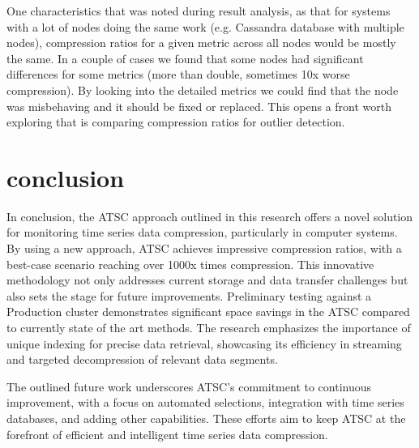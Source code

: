 \documentclass[conference]{IEEEtran}
\begin{document}
One characteristics that was noted during result analysis, as that for systems with a lot of nodes doing the same work (e.g. Cassandra database with multiple nodes), compression ratios for a given metric across all nodes would be mostly the same.
In a couple of cases we found that some nodes had significant differences for some metrics (more than double, sometimes 10x worse compression). By looking into the detailed metrics we could find that the node was misbehaving and it should be fixed 
or replaced. This opens a front worth exploring that is comparing compression ratios for outlier detection.



\section{conclusion}

In conclusion, the ATSC approach outlined in this research offers a novel solution for monitoring time series data compression, particularly in computer systems. By using a new approach, ATSC achieves impressive compression ratios, with a best-case scenario reaching over 1000x times compression. This innovative methodology not only addresses current storage and data transfer challenges but also sets the stage for future improvements.
\vspace{5pt}
Preliminary testing against a Production cluster demonstrates significant space savings in the ATSC compared to currently state of the art methods. The research emphasizes the importance of unique indexing for precise data retrieval, showcasing its efficiency in streaming and targeted decompression of relevant data segments.

The outlined future work underscores ATSC's commitment to continuous improvement, with a focus on automated selections, integration with time series databases, and adding other capabilities. These efforts aim to keep ATSC at the forefront of efficient and intelligent time series data compression.
\end{document}
